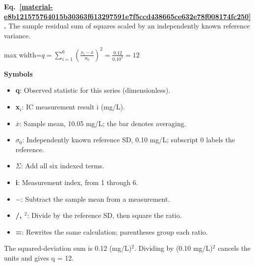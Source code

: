 \documentclass[11pt,a4paper]{article}
\begin{document}
\par\medskip
\begin{samepage}
\label{material-e8b121575764015b30363f613297591e7f5ccd438665ce632e78f008174fc250}
\noindent\textbf{Eq.~\ref*{material-e8b121575764015b30363f613297591e7f5ccd438665ce632e78f008174fc250}.} The sample residual sum of squares scaled by an independently known reference variance.\par\nopagebreak
\begin{center}\begin{adjustbox}{max width=\linewidth}$\displaystyle q=\sum_{i=1}^{6}\left(\frac{x_i-\bar x}{\sigma_0}\right)^2=\frac{0.12}{0.10^2}=12$\end{adjustbox}\end{center}

\par\noindent\textbf{Symbols}

\begin{itemize}\setlength{\itemsep}{1pt}\setlength{\parsep}{0pt}
\item \textbf{q}: Observed statistic for this series (dimensionless).
\item \textbf{x\ensuremath{{}_i}}: IC measurement result i (mg/L).
\item \textbf{\ensuremath{\bar{x}}}: Sample mean, 10.05 mg/L; the bar denotes averaging.
\item \textbf{\ensuremath{\sigma}\ensuremath{{}_0}}: Independently known reference SD, 0.10 mg/L; subscript 0 labels the reference.
\end{itemize}

\begin{itemize}\setlength{\itemsep}{1pt}\setlength{\parsep}{0pt}
\item \textbf{\ensuremath{\Sigma}}: Add all six indexed terms.
\item \textbf{i}: Measurement index, from 1 through 6.
\item \textbf{\ensuremath{-}}: Subtract the sample mean from a measurement.
\item \textbf{/, \ensuremath{{}^2}}: Divide by the reference SD, then square the ratio.
\item \textbf{=}: Rewrites the same calculation; parentheses group each ratio.
\end{itemize}

The squared-deviation sum is 0.12 (mg/L)\ensuremath{{}^2}. Dividing by (0.10 mg/L)\ensuremath{{}^2} cancels the units and gives q = 12.

\end{samepage}
\medskip
\end{document}
